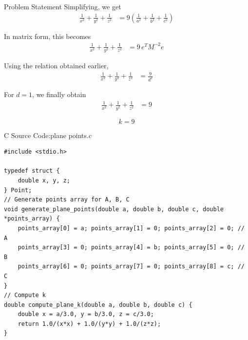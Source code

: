 \documentclass{beamer}
\numberwithin{equation}{section}
\providecommand{\brak}[1]{\ensuremath{\left(#1\right)}}
\theoremstyle{remark}
\begin{document}
\begin{frame}{Problem Statement}
Simplifying, we get
\begin{align}
\frac{1}{x^2} + \frac{1}{y^2} + \frac{1}{z^2}
&= 9\brak{\frac{1}{a^2} + \frac{1}{b^2} + \frac{1}{c^2}}
\end{align}

In matrix form, this becomes
\begin{align}
\frac{1}{x^2} + \frac{1}{y^2} + \frac{1}{z^2}
&= 9\, e^T M^{-2} e
\end{align}

Using the relation obtained earlier,
\begin{align}
\frac{1}{x^2} + \frac{1}{y^2} + \frac{1}{z^2}
&= \frac{9}{d^2}
\end{align}

For $d=1$, we finally obtain
\begin{align}
\frac{1}{x^2} + \frac{1}{y^2} + \frac{1}{z^2} &= 9
\end{align}

\[
\boxed{k=9}
\]


\end{frame}

\begin{frame}[fragile]{C Source Code:plane points.c}
\begin{verbatim}
#include <stdio.h>

typedef struct {
    double x, y, z;
} Point;
// Generate points array for A, B, C
void generate_plane_points(double a, double b, double c, double *points_array) {
    points_array[0] = a; points_array[1] = 0; points_array[2] = 0; // A
    points_array[3] = 0; points_array[4] = b; points_array[5] = 0; // B
    points_array[6] = 0; points_array[7] = 0; points_array[8] = c; // C
}
// Compute k
double compute_plane_k(double a, double b, double c) {
    double x = a/3.0, y = b/3.0, z = c/3.0;
    return 1.0/(x*x) + 1.0/(y*y) + 1.0/(z*z);
}


\end{verbatim}
\end{frame}
\end{document}
